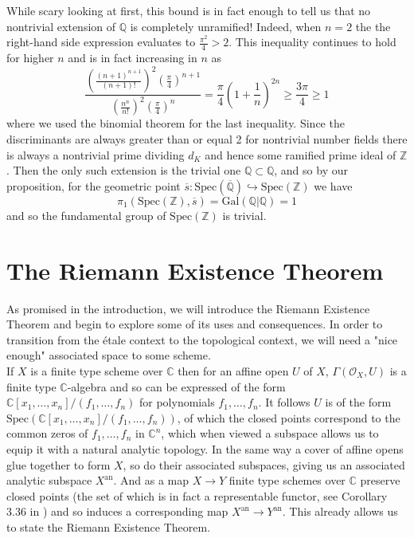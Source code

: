 \documentclass{article}
\theoremstyle{definition}
\theoremstyle{remark}
\theoremstyle{plain}
\newcommand{\C}{\mathbb{C}}
\newcommand{\Z}{\mathbb{Z}}
\newcommand{\Q}{\mathbb{Q}}
\newcommand{\mc}[1]{\mathcal{#1}}
\begin{document}
While scary looking at first, this bound is in fact enough to tell us that no nontrivial extension of $\Q$ is completely unramified!
Indeed, when $n = 2$ the the right-hand side expression evaluates to $ \frac{\pi^2}{4} > 2$.
This inequality continues to hold for higher $n$ and is in fact increasing in $n$ as 
\[ \frac{(\frac{(n+1)^{n+1}}{(n+1)!})^2 ( \frac{\pi}{4})^{n+1}}{(\frac{n^n}{n!})^2 ( \frac{\pi}{4})^n} = \frac{\pi}{4}  (1 + \frac{1}{n})^{2n} \geq \frac{3 \pi}{4} \geq 1\]
where we used the binomial theorem for the last inequality.
Since the discriminants are always greater than or equal 2 for nontrivial number fields there is always a nontrivial prime dividing $d_K$ and hence some ramified prime ideal of $\Z$.
Then the only such extension is the trivial one $\Q \subset \Q$, and so by our proposition, for the geometric point $\overline{s}: \text{Spec}( \overline{\Q}) \hookrightarrow \text{Spec}(\Z)$ we have 
\[\pi_1(\text{Spec}(\Z), \overline{s}) = \text{Gal}(\Q|\Q) = 1\]
and so the fundamental group of $\text{Spec}(\Z)$ is trivial.

\section{The Riemann Existence Theorem}

As promised in the introduction, we will introduce the Riemann Existence Theorem and begin to explore some of its uses and consequences.
In order to transition from the \'etale context to the topological context, we will need a "nice enough" associated space to some scheme.\\

\indent If $X$ is a finite type scheme over $\C$ then for an affine open $U$ of $X$, $\Gamma(\mc{O}_X, U)$ is a finite type $\C$-algebra and so can be expressed of the form $\C[x_1, \dots, x_n]/(f_1, \dots, f_n)$ for polynomials $f_1, \dots, f_n$.
It follows $U$ is of the form $\text{Spec}(\C[x_1, \dots, x_n]/(f_1, \dots, f_n))$, of which the closed points correspond to the common zeros of $f_1, \dots, f_n$ in $\C^n$, which when viewed a subspace allows us to equip it with a natural analytic topology.
In the same way a cover of affine opens glue together to form $X$, so do their associated subspaces, giving us an associated analytic subspace $X^{\text{an}}$.
And as a map $X \to Y$ finite type schemes over $\C$ preserve closed points (the set of which is in fact a representable functor, see Corollary 3.36 in \cite{GW}) and so induces a corresponding map $X^{\text{an}} \to Y^{\text{an}}$.
This already allows us to state the Riemann Existence Theorem.
\end{document}
